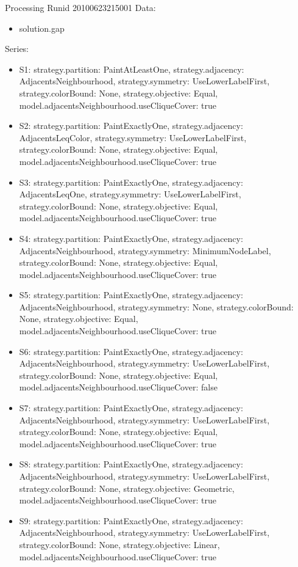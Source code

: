 \documentclass[landscape, 12pt]{report}
\begin{document}
Processing Runid 20100623215001
Data:
\begin{itemize}
\item solution.gap
\end{itemize}
Series:
\begin{itemize}
\item S1: strategy.partition: PaintAtLeastOne, strategy.adjacency: AdjacentsNeighbourhood, strategy.symmetry: UseLowerLabelFirst, strategy.colorBound: None, strategy.objective: Equal, model.adjacentsNeighbourhood.useCliqueCover: true
\item S2: strategy.partition: PaintExactlyOne, strategy.adjacency: AdjacentsLeqColor, strategy.symmetry: UseLowerLabelFirst, strategy.colorBound: None, strategy.objective: Equal, model.adjacentsNeighbourhood.useCliqueCover: true
\item S3: strategy.partition: PaintExactlyOne, strategy.adjacency: AdjacentsLeqOne, strategy.symmetry: UseLowerLabelFirst, strategy.colorBound: None, strategy.objective: Equal, model.adjacentsNeighbourhood.useCliqueCover: true
\item S4: strategy.partition: PaintExactlyOne, strategy.adjacency: AdjacentsNeighbourhood, strategy.symmetry: MinimumNodeLabel, strategy.colorBound: None, strategy.objective: Equal, model.adjacentsNeighbourhood.useCliqueCover: true
\item S5: strategy.partition: PaintExactlyOne, strategy.adjacency: AdjacentsNeighbourhood, strategy.symmetry: None, strategy.colorBound: None, strategy.objective: Equal, model.adjacentsNeighbourhood.useCliqueCover: true
\item S6: strategy.partition: PaintExactlyOne, strategy.adjacency: AdjacentsNeighbourhood, strategy.symmetry: UseLowerLabelFirst, strategy.colorBound: None, strategy.objective: Equal, model.adjacentsNeighbourhood.useCliqueCover: false
\item S7: strategy.partition: PaintExactlyOne, strategy.adjacency: AdjacentsNeighbourhood, strategy.symmetry: UseLowerLabelFirst, strategy.colorBound: None, strategy.objective: Equal, model.adjacentsNeighbourhood.useCliqueCover: true
\item S8: strategy.partition: PaintExactlyOne, strategy.adjacency: AdjacentsNeighbourhood, strategy.symmetry: UseLowerLabelFirst, strategy.colorBound: None, strategy.objective: Geometric, model.adjacentsNeighbourhood.useCliqueCover: true
\item S9: strategy.partition: PaintExactlyOne, strategy.adjacency: AdjacentsNeighbourhood, strategy.symmetry: UseLowerLabelFirst, strategy.colorBound: None, strategy.objective: Linear, model.adjacentsNeighbourhood.useCliqueCover: true

\end{itemize}
\end{document}
